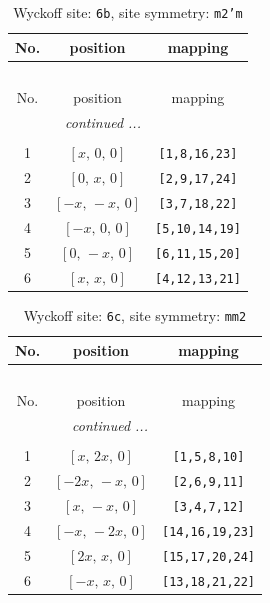 \documentclass[fleqn,8pt]{jsarticle}
\begin{document}
\begin{longtable}{ccc}
\caption{Wyckoff site: {\tt 6b}, site symmetry: {\tt m2'm}}
 \\
 \hline \hline
No. & position & mapping \\ \hline \endfirsthead

\multicolumn{2}{l}{\tablename\ \thetable{}} \\
 \hline \hline
No. & position & mapping \\ \hline \endhead

 \hline \hline
\multicolumn{2}{r}{\footnotesize\it continued ...} \\ \endfoot

 \hline \hline
\multicolumn{2}{r}{} \\ \endlastfoot

1 & $\left[ x,\, 0,\, 0 \right]$ & {\tt [1,8,16,23]} \\ \hline
2 & $\left[ 0,\, x,\, 0 \right]$ & {\tt [2,9,17,24]} \\ \hline
3 & $\left[ - x,\, - x,\, 0 \right]$ & {\tt [3,7,18,22]} \\ \hline
4 & $\left[ - x,\, 0,\, 0 \right]$ & {\tt [5,10,14,19]} \\ \hline
5 & $\left[ 0,\, - x,\, 0 \right]$ & {\tt [6,11,15,20]} \\ \hline
6 & $\left[ x,\, x,\, 0 \right]$ & {\tt [4,12,13,21]} \\
\end{longtable}
\renewcommand{\arraystretch}{1.2}
\begin{longtable}{ccc}
\caption{Wyckoff site: {\tt 6c}, site symmetry: {\tt mm2}}
 \\
 \hline \hline
No. & position & mapping \\ \hline \endfirsthead

\multicolumn{2}{l}{\tablename\ \thetable{}} \\
 \hline \hline
No. & position & mapping \\ \hline \endhead

 \hline \hline
\multicolumn{2}{r}{\footnotesize\it continued ...} \\ \endfoot

 \hline \hline
\multicolumn{2}{r}{} \\ \endlastfoot

1 & $\left[ x,\, 2 x,\, 0 \right]$ & {\tt [1,5,8,10]} \\ \hline
2 & $\left[ - 2 x,\, - x,\, 0 \right]$ & {\tt [2,6,9,11]} \\ \hline
3 & $\left[ x,\, - x,\, 0 \right]$ & {\tt [3,4,7,12]} \\ \hline
4 & $\left[ - x,\, - 2 x,\, 0 \right]$ & {\tt [14,16,19,23]} \\ \hline
5 & $\left[ 2 x,\, x,\, 0 \right]$ & {\tt [15,17,20,24]} \\ \hline
6 & $\left[ - x,\, x,\, 0 \right]$ & {\tt [13,18,21,22]} \\
\end{longtable}
\end{document}
